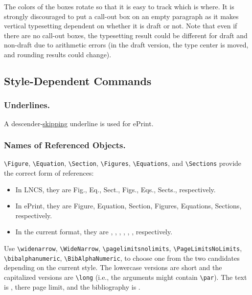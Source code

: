 
The colors of the boxes rotate so that it is easy to track which is where.
It is strongly discouraged to put a call-out box on an empty paragraph
as it makes vertical typesetting dependent on whether it is draft or not.
Note that even if there are no call-out boxes,
the typesetting result could be different for draft and non-draft
due to arithmetic errors
(in the draft version,
the type center is moved, and
rounding results could change).

\subsection{Style-Dependent Commands}

\subsubsection{Underlines.}
A descender-\ul{skipping} underline is used for ePrint.

\subsubsection{Names of Referenced Objects.}
\texttt{\textbackslash Figure},
\texttt{\textbackslash Equation},
\texttt{\textbackslash Section},
\texttt{\textbackslash Figures},
\texttt{\textbackslash Equations}, and
\texttt{\textbackslash Sections}
provide the correct form of references:
\begin{itemize}
\item
In LNCS, they are Fig., Eq., Sect., Figs., Eqs., Sects., respectively.
\item
In ePrint, they are Figure, Equation, Section, Figures, Equations, Sections, respectively.
\item
In the current format, they are
\Figure, \Equation, \Section, \Figures, \Equations, \Sections, respectively.
\end{itemize}
Use \texttt{\textbackslash widenarrow},
\texttt{\textbackslash WideNarrow},
\texttt{\textbackslash pagelimitsnolimits},
\texttt{\textbackslash PageLimitsNoLimits},
\texttt{\textbackslash bibalphanumeric},
\texttt{\textbackslash BibAlphaNumeric},
to choose one from the two candidates depending on the current style.
The lowercase versions are short and
the capitalized versions are \texttt{\textbackslash long}
(i.e., the arguments might contain \texttt{\textbackslash par}).
The text is ,
there  page limit,
and the bibliography is .

